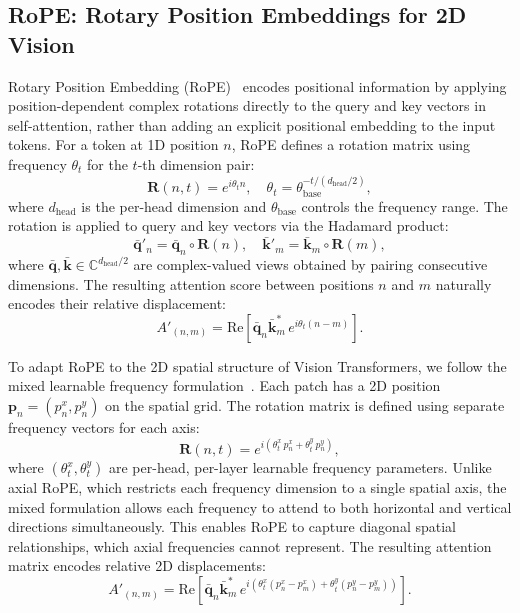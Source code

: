 \subsection{RoPE: Rotary Position Embeddings for 2D Vision}

Rotary Position Embedding (RoPE)~\cite{su2024roformer} encodes positional information by applying position-dependent complex rotations directly to the query and key vectors in self-attention, rather than adding an explicit positional embedding to the input tokens. For a token at 1D position $n$, RoPE defines a rotation matrix using frequency $\theta_t$ for the $t$-th dimension pair:
\begin{equation}
\mathbf{R}(n, t) = e^{i \theta_t n}, \quad \theta_t = \theta_{\text{base}}^{-t/(d_{\text{head}}/2)},
\end{equation}
where $d_{\text{head}}$ is the per-head dimension and $\theta_{\text{base}}$ controls the frequency range. The rotation is applied to query and key vectors via the Hadamard product:
\begin{equation}
\bar{\mathbf{q}}'_n = \bar{\mathbf{q}}_n \circ \mathbf{R}(n), \quad \bar{\mathbf{k}}'_m = \bar{\mathbf{k}}_m \circ \mathbf{R}(m),
\end{equation}
where $\bar{\mathbf{q}}, \bar{\mathbf{k}} \in \mathbb{C}^{d_{\text{head}}/2}$ are complex-valued views obtained by pairing consecutive dimensions. The resulting attention score between positions $n$ and $m$ naturally encodes their relative displacement:
\begin{equation}
A'_{(n,m)} = \text{Re}[\bar{\mathbf{q}}_n \bar{\mathbf{k}}_m^* \, e^{i\theta_t(n - m)}].
\end{equation}

To adapt RoPE to the 2D spatial structure of Vision Transformers, we follow the mixed learnable frequency formulation~\cite{heo2024rope}. Each patch has a 2D position $\mathbf{p}_n = (p_n^x, p_n^y)$ on the spatial grid. The rotation matrix is defined using separate frequency vectors for each axis:
\begin{equation}
\mathbf{R}(n, t) = e^{i(\theta_t^x \, p_n^x + \theta_t^y \, p_n^y)},
\end{equation}
where $(\theta_t^x, \theta_t^y)$ are per-head, per-layer learnable frequency parameters. Unlike axial RoPE, which restricts each frequency dimension to a single spatial axis, the mixed formulation allows each frequency to attend to both horizontal and vertical directions simultaneously. This enables RoPE to capture diagonal spatial relationships, which axial frequencies cannot represent. The resulting attention matrix encodes relative 2D displacements:
\begin{equation}
A'_{(n,m)} = \text{Re}\!\left[\bar{\mathbf{q}}_n \bar{\mathbf{k}}_m^* \, e^{i(\theta_t^x (p_n^x - p_m^x) + \theta_t^y (p_n^y - p_m^y))}\right].
\end{equation}

